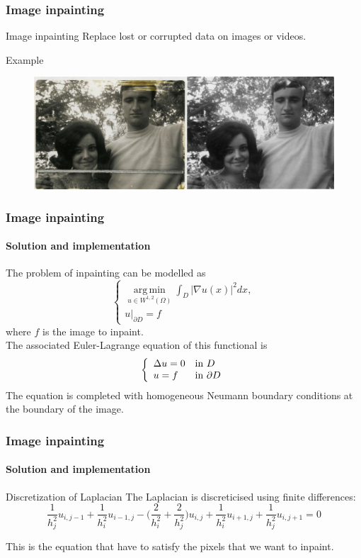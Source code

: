 \documentclass[11pt]{beamer}
\DeclareMathOperator*{\argmin}{\mathrm{arg\, min}}
\begin{document}
\begin{frame}
\frametitle{Image inpainting}

\begin{block}{Image inpainting}
Replace lost or corrupted data on images or videos.
\end{block}

\begin{exampleblock}{Example}
\begin{figure}
\begin{center}
\includegraphics[scale=4.2]{Restoration}
\end{center}
\end{figure}
\end{exampleblock}
\end{frame}

\begin{frame}
\frametitle{Image inpainting}
\framesubtitle{Solution and implementation}
The problem of inpainting can be modelled as
$$
\begin{cases}
\displaystyle\argmin\limits_{u\in W^{1,2}(\Omega)}\int _D |\nabla u(x)|^2dx,\\
u|_{\partial D} = f
\end{cases}
$$
where $f$ is the image to inpaint.\\

The associated Euler-Lagrange equation of this functional is
$$\left\lbrace
\begin{array}{l l}

\Delta u = 0& \text{in }D \\
u = f & \text{in }\partial D

\end{array}\right.
$$
The equation is completed with homogeneous Neumann boundary
conditions at the boundary of the image.

\end{frame}
\begin{frame}
\frametitle{Image inpainting}
\framesubtitle{Solution and implementation}
\begin{block}{Discretization of Laplacian}
The Laplacian is discreticised using finite differences:
\vfill
$$\frac{1}{h_j^2}u_{i,j-1} + \frac{1}{h_i^2}u_{i-1, j} - \bigg(\frac{2}{h_i^2}+\frac{2}{h_j^2}\bigg)u_{i,j} + \frac{1}{h_i^2}u_{i+1,j} + \frac{1}{h_j^2}u_{i, j+1} = 0$$
\vfill

This is the equation that have to satisfy the pixels that we want to inpaint.
\end{block}
\end{frame}
\end{document}
